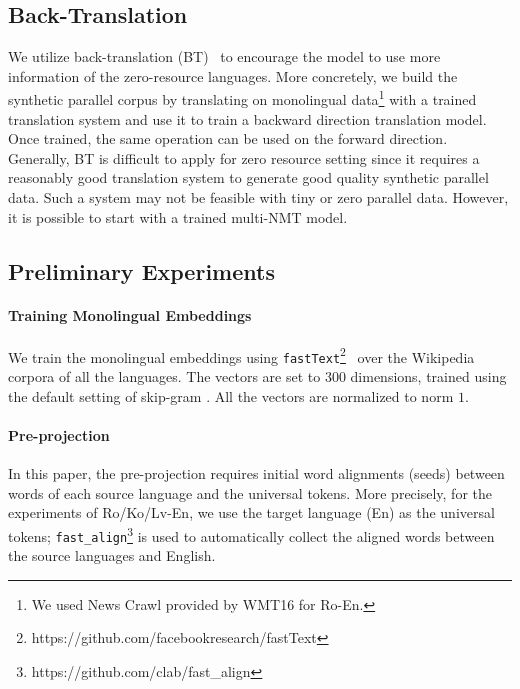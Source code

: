 \subsection{Back-Translation}
We utilize back-translation (BT)~\cite{sennrich2016edinburgh} to encourage the model to use more information of the zero-resource languages. More concretely, we build the synthetic parallel corpus by translating on monolingual data\footnote{We used News Crawl provided by WMT16 for Ro-En.} with a trained translation system and use it to train a backward direction translation model. Once trained, the same operation can be used on the forward direction. 
Generally, BT is difficult to apply for zero resource setting since it requires a reasonably good translation system to generate good quality synthetic parallel data. Such a system may not be feasible with tiny or zero parallel data. However, it is possible to start with a trained multi-NMT model.

\subsection{Preliminary Experiments}
\paragraph{Training Monolingual Embeddings} We train the monolingual embeddings using \texttt{fastText}\footnote{https://github.com/facebookresearch/fastText}~\cite{bojanowski2016enriching}  over the Wikipedia corpora of all the languages.  The vectors are set to 300 dimensions, trained using the default setting of skip-gram . All the vectors are normalized to norm $1$.

\paragraph{Pre-projection} In this paper, the pre-projection requires initial word alignments (seeds) between words of each source language and the universal tokens.  More precisely, for the experiments of Ro/Ko/Lv-En, we use the target language (En) as the universal tokens;  \texttt{fast\_align}\footnote{https://github.com/clab/fast\_align} is used to automatically collect the aligned words between the source languages and English. %

